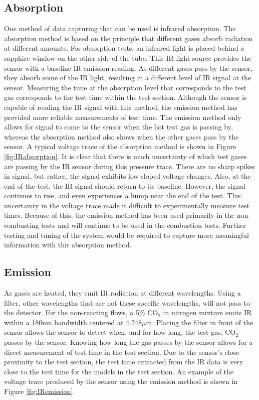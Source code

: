 
\subsection{Absorption}

One method of data capturing that can be used is infrared absorption. The absorption method is based on the principle that different gases absorb radiation at different amounts. For absorption tests, an infrared light is placed behind a sapphire window on the other side of the tube. This IR light source provides the sensor with a baseline IR emission reading. As different gases pass by the sensor, they absorb some of the IR light, resulting in a different level of IR signal at the sensor. Measuring the time at the absorption level that corresponds to the test gas corresponds to the test time within the test section. Although the sensor is capable of reading the IR signal with this method, the emission method has provided more reliable measurements of test time. The emission method only allows for signal to come to the sensor when the hot test gas is passing by, whereas the absorption method also shows when the other gases pass by the sensor. A typical voltage trace of the absorption method is shown in Figure \ref{fig:IRabsorption}. It is clear that there is much uncertainty of which test gases are passing by the IR sensor during this pressure trace. There are no sharp spikes in signal, but rather, the signal exhibits low sloped voltage changes. Also, at the end of the test, the IR signal should return to its baseline. However, the signal continues to rise, and even experiences a hump near the end of the test. This uncertainty in the voltage trace made it difficult to experimentally measure test times. Because of this, the emission method has been used primarily in the non-combusting tests and will continue to be used in the combustion tests. Further testing and tuning of the system would be required to capture more meaningful information with this absorption method. 



\subsection{Emission}

As gases are heated, they emit IR radiation at different wavelengths. Using a filter, other wavelengths that are not these specific wavelengths, will not pass to the detector. For the non-reacting flows, a 5\% CO$_2$ in nitrogen mixture emits IR within a 180nm bandwidth centered at 4.248$\mu$m. Placing the filter in front of the sensor allows the sensor to detect when, and for how long, the test gas, CO$_2$ passes by the sensor. Knowing how long the gas passes by the sensor allows for a direct measurement of test time in the test section. Due to the sensor's close proximity to the test section, the test time extracted from the IR data is very close to the test time for the models in the test section. An example of the voltage trace produced by the sensor using the emission method is shown in Figure \ref{fig:IRemission}. 

